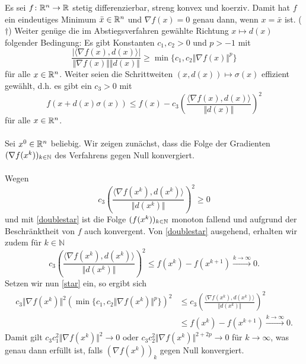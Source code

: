 
Es sei $f\colon\mathbb{R}^n\to\mathbb{R}$ stetig differenzierbar, streng konvex und koerziv.
Damit hat $f$ ein eindeutiges Minimum $\bar x\in\mathbb{R}^n$ und $\nabla f(x)=0$ genau
dann, wenn $x=\bar x$ ist. ($\dagger$)
Weiter genüge die im Abstiegsverfahren gewählte Richtung $x\mapsto d(x)$
folgender Bedingung: Es gibt Konstanten $c_1,c_2>0$ und $p>-1$ mit
\begin{displaymath}\label{star}
 \frac{|\langle \nabla f(x),d(x)\rangle|}{\Vert\nabla f(x)\Vert\Vert d(x)\Vert}\geq\min\{c_1,c_2\Vert \nabla f(x)\Vert^p\}\tag{$\star$}
\end{displaymath}
für alle $x\in\mathbb{R}^n$. Weiter seien die Schrittweiten $(x,d(x))\mapsto \sigma(x)$
effizient gewählt, d.h. es gibt ein $c_3>0$ mit
\begin{displaymath}\label{doublestar}
 f(x+d(x)\sigma(x))\leq f(x)-c_3\left(\frac{\langle\nabla f(x),d(x)\rangle}{\Vert d(x)\Vert}\right)^2 \tag{$\star\star$}
\end{displaymath}
für alle $x\in\mathbb{R}^n$.
\\ \\
Sei $x^0\in\mathbb{R}^n$ beliebig. Wir zeigen zunächst, dass die Folge der Gradienten
$(\nabla f(x^k))_{k\in\mathbb{N}}$ des  Verfahrens gegen Null konvergiert.
\\\\
Wegen
\begin{displaymath}
 c_3\left(\frac{\langle\nabla f(x^k),d(x^k)\rangle}{\Vert d(x^k)\Vert}\right)^2\geq0
\end{displaymath}
und  mit \eqref{doublestar} ist die Folge $(f(x^k))_{k\in\mathbb{N}}$ monoton fallend und aufgrund der Beschränktheit von $f$ auch konvergent.
Von \eqref{doublestar} ausgehend, erhalten wir zudem für $k\in\mathbb{N}$
\begin{displaymath}
 c_3\left(\frac{\langle\nabla f(x^k),d(x^k)\rangle}{\Vert d(x^k)\Vert}\right)^2 \leq f(x^k)-f(x^{k+1}) \overset{k\to\infty}{\to} 0.
\end{displaymath}
Setzen wir nun \eqref{star} ein, so ergibt sich
\begin{align*}
 c_3\Vert\nabla f(x^k)\Vert^2 (\min\{c_1,c_2\Vert \nabla f(x^k)\Vert^p\})^2 &\leq c_3\left(\frac{\langle\nabla f(x^k),d(x^k)\rangle}{\Vert d(x^k)\Vert}\right)^2 \\
 &\leq f(x^k)-f(x^{k+1}) \overset{k\to\infty}{\to} 0.
\end{align*}
Damit gilt $c_3c_1^2\Vert\nabla f(x^k)\Vert^2\to 0$ oder $c_3c_2^2\Vert\nabla f(x^k)\Vert^{2+2p}\to 0$ für $k\to\infty$,
was genau dann erfüllt ist, falls $(\nabla f(x^k))_k$ gegen Null konvergiert.
